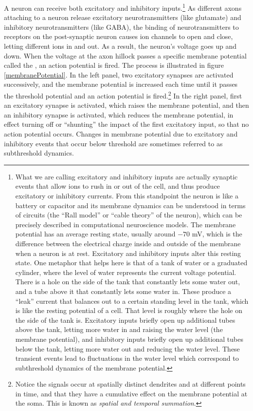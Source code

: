 A neuron can receive both excitatory and inhibitory inputs.\footnote{What we are calling excitatory and inhibitory inputs are actually synaptic events that allow ions to rush in or out of the cell, and thus produce excitatory or inhibitory currents. From this standpoint the neuron is like a battery or capacitor and its membrane dynamics can be understood in terms of circuits (the ``Rall model'' or ``cable theory'' of the neuron), which can be precisely described in computational neuroscience models. The membrane potential has an average resting state, usually around $-70$ mV, which is the difference between the electrical charge inside and outside of the membrane when a neuron is at rest. Excitatory and inhibitory inputs alter this resting state. One metaphor that helps here is that of a tank of water or a graduated cylinder, where the level of water represents the current voltage potential. There is a hole on the side of the tank that constantly lets some water out, and a tube above it that constantly lets some water in. These produce a ``leak'' current that balances out to a certain standing level in the tank, which is like the resting potential of a cell. That level is roughly where the hole on the side of the tank is. Excitatory inputs briefly open up additional tubes above the tank, letting more water in and raising the water level (the membrane potential), and inhibitory inputs briefly open up additional tubes below the tank, letting more water out and reducing the water level. These transient events lead to fluctuations in the water level which correspond to subthreshold dynamics of the membrane potential.} As different axons attaching to a neuron release excitatory neurotransmitters (like glutamate) and inhibitory neurotransmitters (like GABA), the binding of neurotransmitters to receptors on the post-synaptic neuron causes ion channels to open and close, letting different ions in and out. As a result, the neuron's voltage goes up and down. When the voltage at the axon hillock passes a specific membrane potential called the , an action potential is fired. The process is illustrated in figure \ref{membranePotential}. In the left panel, two excitatory synapses are activated successively, and the membrane potential is increased each time until it passes the threshold potential and an action potential is fired.\footnote{Notice the signals occur at spatially distinct dendrites and at different points in time, and that they have a cumulative effect on the membrane potential at the soma. This is known as \emph{spatial and temporal summation}.}  In the right panel, first an excitatory synapse is activated, which raises the membrane potential, and then an inhibitory synapse is activated, which reduces the membrane potential, in effect turning off or ``shunting'' the impact of the first excitatory input, so that no action potential occurs. Changes in membrane potential due to excitatory and inhibitory events that occur below threshold are sometimes referred to as subthreshold dynamics.

